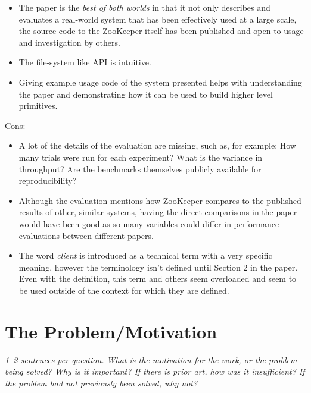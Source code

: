 \documentclass[11pt]{article}
\begin{document}
\begin{itemize}

    \item The paper is the \textit{best of both worlds} in that it not only
    describes and evaluates a real-world system that has been effectively used
    at a large scale, the source-code to the ZooKeeper itself has been
    published and open to usage and investigation by others.

    \item The file-system like API is intuitive.

    \item Giving example usage code of the system presented helps with
    understanding the paper and demonstrating how it can be used to build
    higher level primitives.

\end{itemize}

Cons:

\begin{itemize}

    \item A lot of the details of the evaluation are missing, such as, for
    example: How many trials were run for each experiment? What is the variance
    in throughput? Are the benchmarks themselves publicly available for
    reproducibility?

    \item Although the evaluation mentions how ZooKeeper compares to the
    published results of other, similar systems, having the direct comparisons
    in the paper would have been good as so many variables could differ in
    performance evaluations between different papers.

    \item The word \textit{client} is introduced as a technical term with a
    very specific meaning, however the terminology isn't defined until Section
    2 in the paper. Even with the definition, this term and others seem
    overloaded and seem to be used outside of the context for which they are
    defined.

\end{itemize}

\section*{The Problem/Motivation}

\textsl{1--2 sentences per question. What is the motivation for the work, or
the problem being solved? Why is it important? If there is prior art, how was
it insufficient? If the problem had not previously been solved, why not?}
\end{document}
